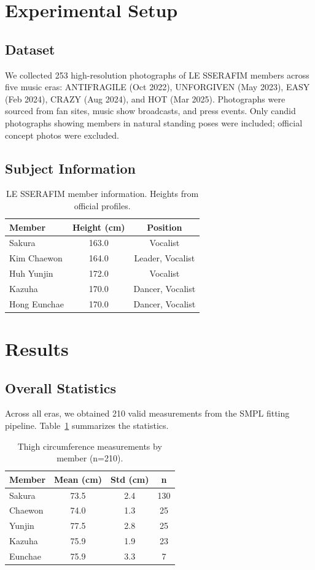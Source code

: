\documentclass[11pt,a4paper]{article}
\begin{document}
\section{Experimental Setup}

\subsection{Dataset}
We collected 253 high-resolution photographs of LE SSERAFIM members across five music eras: ANTIFRAGILE (Oct 2022), UNFORGIVEN (May 2023), EASY (Feb 2024), CRAZY (Aug 2024), and HOT (Mar 2025). Photographs were sourced from fan sites, music show broadcasts, and press events. Only candid photographs showing members in natural standing poses were included; official concept photos were excluded.

\subsection{Subject Information}
\begin{table}[h]
\centering
\begin{tabular}{lcc}
\toprule
Member & Height (cm) & Position \\
\midrule
Sakura & 163.0 & Vocalist \\
Kim Chaewon & 164.0 & Leader, Vocalist \\
Huh Yunjin & 172.0 & Vocalist \\
Kazuha & 170.0 & Dancer, Vocalist \\
Hong Eunchae & 170.0 & Dancer, Vocalist \\
\bottomrule
\end{tabular}
\caption{LE SSERAFIM member information. Heights from official profiles.}
\end{table}

\section{Results}

\subsection{Overall Statistics}
Across all eras, we obtained 210 valid measurements from the SMPL fitting pipeline. Table~\ref{tab:results} summarizes the statistics.

\begin{table}[H]
\centering
\begin{tabular}{lccc}
\toprule
Member & Mean (cm) & Std (cm) & n \\
\midrule
        Sakura & 73.5 & 2.4 & 130 \\
        Chaewon & 74.0 & 1.3 & 25 \\
        Yunjin & 77.5 & 2.8 & 25 \\
        Kazuha & 75.9 & 1.9 & 23 \\
        Eunchae & 75.9 & 3.3 & 7 \\
\bottomrule
\end{tabular}
\caption{Thigh circumference measurements by member (n=210).}
\label{tab:results}
\end{table}
\end{document}
